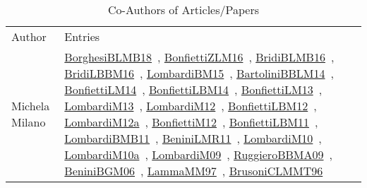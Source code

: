 {\scriptsize
\begin{longtable}{p{4cm}p{20cm}}
\rowcolor{white}\caption{Co-Authors of Articles/Papers}\\ \toprule
\rowcolor{white}Author & Entries \\ \midrule\endhead
\bottomrule
\endfoot
Michela Milano & \href{articles/BorghesiBLMB18.pdf}{BorghesiBLMB18}~\cite{BorghesiBLMB18}, \href{papers/BonfiettiZLM16.pdf}{BonfiettiZLM16}~\cite{BonfiettiZLM16}, \href{articles/BridiBLMB16.pdf}{BridiBLMB16}~\cite{BridiBLMB16}, \href{papers/BridiLBBM16.pdf}{BridiLBBM16}~\cite{BridiLBBM16}, \href{papers/LombardiBM15.pdf}{LombardiBM15}~\cite{LombardiBM15}, \href{papers/BartoliniBBLM14.pdf}{BartoliniBBLM14}~\cite{BartoliniBBLM14}, \href{papers/BonfiettiLM14.pdf}{BonfiettiLM14}~\cite{BonfiettiLM14}, \href{articles/BonfiettiLBM14.pdf}{BonfiettiLBM14}~\cite{BonfiettiLBM14}, \href{papers/BonfiettiLM13.pdf}{BonfiettiLM13}~\cite{BonfiettiLM13}, \href{papers/LombardiM13.pdf}{LombardiM13}~\cite{LombardiM13}, \href{articles/LombardiM12.pdf}{LombardiM12}~\cite{LombardiM12}, \href{papers/BonfiettiLBM12.pdf}{BonfiettiLBM12}~\cite{BonfiettiLBM12}, \href{articles/LombardiM12a.pdf}{LombardiM12a}~\cite{LombardiM12a}, \href{papers/BonfiettiM12.pdf}{BonfiettiM12}~\cite{BonfiettiM12}, \href{papers/BonfiettiLBM11.pdf}{BonfiettiLBM11}~\cite{BonfiettiLBM11}, \href{papers/LombardiBMB11.pdf}{LombardiBMB11}~\cite{LombardiBMB11}, \href{articles/BeniniLMR11.pdf}{BeniniLMR11}~\cite{BeniniLMR11}, \href{papers/LombardiM10.pdf}{LombardiM10}~\cite{LombardiM10}, \href{articles/LombardiM10a.pdf}{LombardiM10a}~\cite{LombardiM10a}, \href{papers/LombardiM09.pdf}{LombardiM09}~\cite{LombardiM09}, \href{articles/RuggieroBBMA09.pdf}{RuggieroBBMA09}~\cite{RuggieroBBMA09}, \href{papers/BeniniBGM06.pdf}{BeniniBGM06}~\cite{BeniniBGM06}, \href{articles/LammaMM97.pdf}{LammaMM97}~\cite{LammaMM97}, \href{papers/BrusoniCLMMT96.pdf}{BrusoniCLMMT96}~\cite{BrusoniCLMMT96}\\

\end{longtable}}
